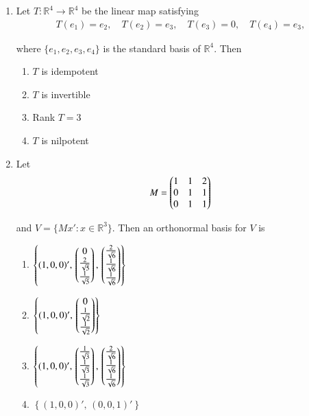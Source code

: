 \documentclass[journal]{IEEEtran}
\numberwithin{equation}{enumi}
\numberwithin{figure}{enumi}
\begin{document}
\begin{enumerate}
\item
Let $T:\mathbb{R}^4 \to \mathbb{R}^4$ be the linear map satisfying
\begin{align}
    T(e_1) = e_2,\quad T(e_2) = e_3,\quad T(e_3) = 0,\quad T(e_4) = e_3,
\end{align}


where $\{e_1, e_2, e_3, e_4\}$ is the standard basis of $\mathbb{R}^4$. Then
\hfill{}
\begin{multicols}{2}
\begin{enumerate}
\item $T$ is idempotent
\item $T$ is invertible
\item Rank $T = 3$
\item $T$ is nilpotent
\end{enumerate}

\end{multicols}

\item
Let 
\begin{align}
    M = \begin{pmatrix}1 & 1 & 2 \\ 0 & 1 & 1 \\ 0 & 1 & 1\end{pmatrix}
\end{align}

and $V = \{ M x' : x \in \mathbb{R}^3 \}$. Then an orthonormal basis for $V$ is
\hfill{}
\begin{enumerate}
    \item $\left\{ (1,0,0)',\, \begin{pmatrix}0 \\ \frac{2}{\sqrt{5}} \\ \frac{1}{\sqrt{5}}\end{pmatrix},\, \begin{pmatrix}\frac{2}{\sqrt{6}} \\ \frac{1}{\sqrt{6}} \\ \frac{1}{\sqrt{6}}\end{pmatrix} \right\}$
    \item $\left\{ (1,0,0)',\, \begin{pmatrix}0 \\ \frac{1}{\sqrt{2}} \\ \frac{1}{\sqrt{2}}\end{pmatrix} \right\}$
    \item $\left\{ (1,0,0)',\, \begin{pmatrix}\frac{1}{\sqrt{3}} \\ \frac{1}{\sqrt{3}} \\ \frac{1}{\sqrt{3}}\end{pmatrix},\, \begin{pmatrix}\frac{2}{\sqrt{6}} \\ \frac{1}{\sqrt{6}} \\ \frac{1}{\sqrt{6}}\end{pmatrix} \right\}$
    \item $\left\{ (1,0,0)',\, (0,0,1)' \right\}$
\end{enumerate}


\end{enumerate}
\end{document}
